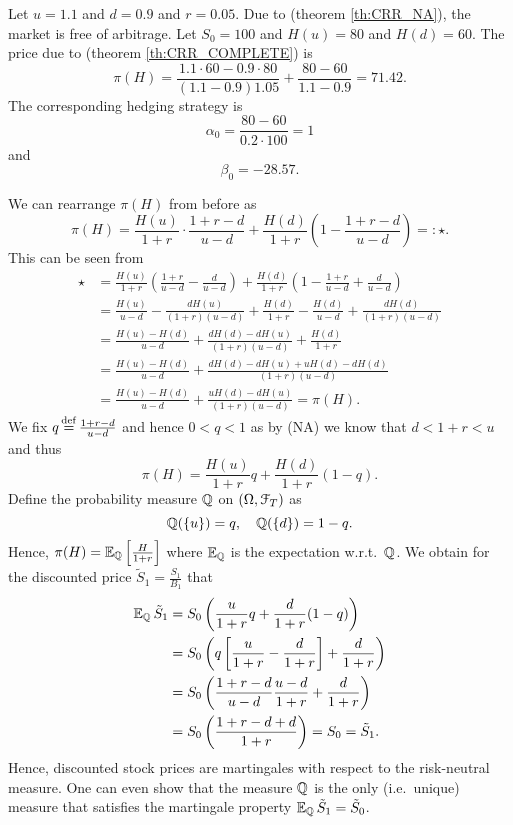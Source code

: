 \documentclass[12pt]{amsart}
\begin{document}
\begin{exercise}
    Let \(u=1.1\) and \(d=0.9\) and \(r=0.05\). Due to (theorem \ref{th:CRR_NA}), the market is free of arbitrage. Let \(S_0 = 100\) and \(H(u)=80\) and \(H(d)=60\). The price due to (theorem \ref{th:CRR_COMPLETE}) is \[
        \pi(H) = \frac{1.1 \cdot 60 - 0.9 \cdot 80}{(1.1 - 0.9) 1.05} + \frac{80-60}{1.1-0.9} = 71.42.
    \]
    The corresponding hedging strategy is \[
        \alpha_0 = \frac{80-60}{0.2 \cdot 100} = 1
    \]
    and \[
        \beta_0 = -28.57.
    \]
\end{exercise}

\begin{remark}
    We can rearrange \(\pi(H)\) from before as \[
        \pi(H) = \frac{H(u)}{1+r} \cdot \frac{1+r-d}{u-d} + \frac{H(d)}{1+r} \left(1-\frac{1+r-d}{u-d}\right) =: \star.
    \]
    This can be seen from \begin{align*}
        \star
        &= \frac{H(u)}{1+r}\left(\frac{1+r}{u-d}-\frac{d}{u-d}\right) + \frac{H(d)}{1+r}\left(1-\frac{1+r}{u-d}+\frac{d}{u-d}\right)\\
        &= \frac{H(u)}{u-d} - \frac{dH(u)}{(1+r)(u-d)} + \frac{H(d)}{1+r} - \frac{H(d)}{u-d} + \frac{d H(d)}{(1+r)(u-d)}\\
        &= \frac{H(u)-H(d)}{u-d} + \frac{dH(d)-dH(u)}{(1+r)(u-d)}+\frac{H(d)}{1+r}\\
        &= \frac{H(u)-H(d)}{u-d} + \frac{dH(d)-dH(u)+uH(d)-dH(d)}{(1+r)(u-d)}\\
        &= \frac{H(u)-H(d)}{u-d} + \frac{uH(d)-dH(u)}{(1+r)(u-d)} = \pi(H).
    \end{align*}
    We fix \(q \operatorname*{\stackrel{\operatorname{def}}{=}} \frac{1+r-d}{u-d}\) and hence \(0 < q < 1\) as by (NA) we know that \(d<1+r<u\) and thus \[
        \pi(H) = \frac{H(u)}{1+r}q+\frac{H(d)}{1+r}(1-q).
    \]
    Define the probability measure \(\mathbb{Q}\) on \((\Omega, \mathcal{F}_T)\) as \[
        \mathbb{Q}(\left\{ u \right\}) = q, \quad \mathbb{Q}(\left\{ d \right\})=1-q.
    \]
    Hence, \(\pi(H) = \operatorname{\mathbb{E}}_{\mathbb{Q}} \left[ \frac{H}{1+r} \right]\) where \(\operatorname{\mathbb{E}}_{\mathbb{Q}}\) is the expectation w.r.t.\ \(\mathbb{Q}\).
    We obtain for the discounted price \(\tilde{S}_1 = \frac{S_1}{B_1}\) that
    \begin{align*}
        \operatorname{\mathbb{E}}_{\mathbb{Q}} \tilde{S}_1
        &= S_0 \left( \frac{u}{1+r}q + \frac{d}{1+r}(1-q) \right)\\
        &= S_0 \left( q \left[ \frac{u}{1+r}-\frac{d}{1+r} \right] + \frac{d}{1+r} \right)\\
        &= S_0 \left( \frac{1+r-d}{u-d} \frac{u-d}{1+r} + \frac{d}{1+r} \right)\\
        &= S_0 \left( \frac{1+r-d+d}{1+r} \right) = S_0 = \tilde{S}_1.
    \end{align*}
    Hence, discounted stock prices are martingales with respect to the risk-neutral measure. One can even show that the measure \(\mathbb{Q}\) is the only (i.e.\ unique) measure that satisfies the martingale property \(\operatorname{\mathbb{E}}_{\mathbb{Q}} \tilde{S}_1 = \tilde{S}_0\).
\end{remark}
\end{document}
